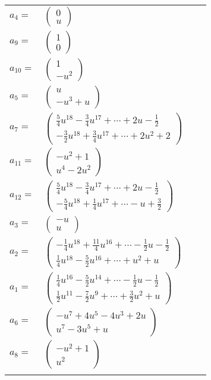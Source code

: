\documentclass[1p]{elsarticle_modified}
\theoremstyle{definition}
\begin{document}
\begin{tabular}{m{7pt} m{180pt} m{7pt} m{180pt} }
\flushright $a_{4}=$&$\begin{pmatrix}0\\u\end{pmatrix}$ \\
\flushright $a_{9}=$&$\begin{pmatrix}1\\0\end{pmatrix}$ \\
\flushright $a_{10}=$&$\begin{pmatrix}1\\- u^2\end{pmatrix}$ \\
\flushright $a_{5}=$&$\begin{pmatrix}u\\- u^3+u\end{pmatrix}$ \\
\flushright $a_{7}=$&$\begin{pmatrix}\frac{5}{4} u^{18}-\frac{3}{4} u^{17}+\cdots+2 u-\frac{1}{2}\\-\frac{3}{2} u^{18}+\frac{3}{4} u^{17}+\cdots+2 u^2+2\end{pmatrix}$ \\
\flushright $a_{11}=$&$\begin{pmatrix}- u^2+1\\u^4-2 u^2\end{pmatrix}$ \\
\flushright $a_{12}=$&$\begin{pmatrix}\frac{5}{4} u^{18}-\frac{3}{4} u^{17}+\cdots+2 u-\frac{1}{2}\\-\frac{5}{4} u^{18}+\frac{1}{4} u^{17}+\cdots- u+\frac{3}{2}\end{pmatrix}$ \\
\flushright $a_{3}=$&$\begin{pmatrix}- u\\u\end{pmatrix}$ \\
\flushright $a_{2}=$&$\begin{pmatrix}-\frac{1}{4} u^{18}+\frac{11}{4} u^{16}+\cdots-\frac{1}{2} u-\frac{1}{2}\\\frac{1}{4} u^{18}-\frac{5}{2} u^{16}+\cdots+u^2+u\end{pmatrix}$ \\
\flushright $a_{1}=$&$\begin{pmatrix}\frac{1}{4} u^{16}-\frac{5}{2} u^{14}+\cdots-\frac{1}{2} u-\frac{1}{2}\\\frac{1}{2} u^{11}-\frac{7}{2} u^9+\cdots+\frac{3}{2} u^2+u\end{pmatrix}$ \\
\flushright $a_{6}=$&$\begin{pmatrix}- u^7+4 u^5-4 u^3+2 u\\u^7-3 u^5+u\end{pmatrix}$ \\
\flushright $a_{8}=$&$\begin{pmatrix}- u^2+1\\u^2\end{pmatrix}$\\&\end{tabular}
\end{document}
